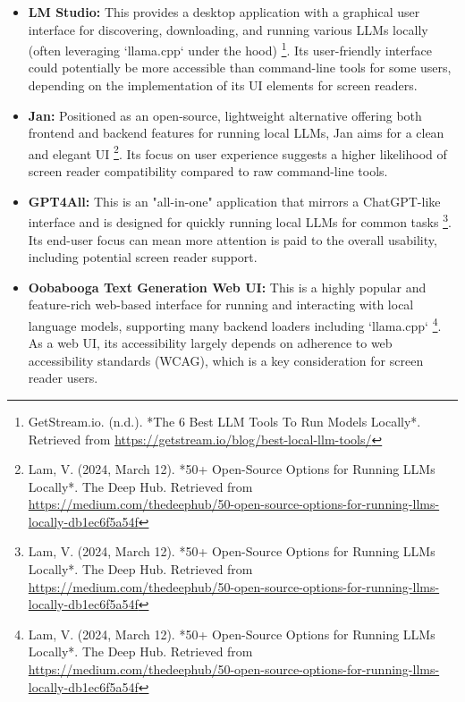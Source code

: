 \begin{itemize}
    \item \textbf{LM Studio:} This provides a desktop application with a graphical user interface for discovering, downloading, and running various LLMs locally (often leveraging `llama.cpp` under the hood) \footnote{GetStream.io. (n.d.). *The 6 Best LLM Tools To Run Models Locally*. Retrieved from \url{https://getstream.io/blog/best-local-llm-tools/}}. Its user-friendly interface could potentially be more accessible than command-line tools for some users, depending on the implementation of its UI elements for screen readers.
    \item \textbf{Jan:} Positioned as an open-source, lightweight alternative offering both frontend and backend features for running local LLMs, Jan aims for a clean and elegant UI \footnote{Lam, V. (2024, March 12). *50+ Open-Source Options for Running LLMs Locally*. The Deep Hub. Retrieved from \url{https://medium.com/thedeephub/50-open-source-options-for-running-llms-locally-db1ec6f5a54f}}. Its focus on user experience suggests a higher likelihood of screen reader compatibility compared to raw command-line tools.
    \item \textbf{GPT4All:} This is an "all-in-one" application that mirrors a ChatGPT-like interface and is designed for quickly running local LLMs for common tasks \footnote{Lam, V. (2024, March 12). *50+ Open-Source Options for Running LLMs Locally*. The Deep Hub. Retrieved from \url{https://medium.com/thedeephub/50-open-source-options-for-running-llms-locally-db1ec6f5a54f}}. Its end-user focus can mean more attention is paid to the overall usability, including potential screen reader support.
    \item \textbf{Oobabooga Text Generation Web UI:} This is a highly popular and feature-rich web-based interface for running and interacting with local language models, supporting many backend loaders including `llama.cpp` \footnote{Lam, V. (2024, March 12). *50+ Open-Source Options for Running LLMs Locally*. The Deep Hub. Retrieved from \url{https://medium.com/thedeephub/50-open-source-options-for-running-llms-locally-db1ec6f5a54f}}. As a web UI, its accessibility largely depends on adherence to web accessibility standards (WCAG), which is a key consideration for screen reader users.
\end{itemize}

